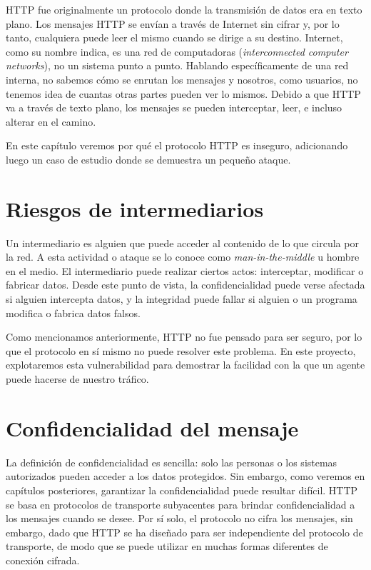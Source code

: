 


HTTP fue originalmente un protocolo donde la transmisión de datos era en texto 
plano. Los mensajes HTTP se envían a través de Internet sin cifrar y, por 
lo tanto, cualquiera puede leer el mismo cuando se dirige a su destino. 
Internet, como su nombre indica, es una red de computadoras 
(\emph{interconnected computer networks}), no un sistema 
punto a punto. Hablando específicamente de una red interna, no sabemos cómo 
se enrutan los 
mensajes y nosotros, como usuarios, no tenemos idea de cuantas otras partes 
pueden ver lo mismos. Debido a que HTTP va a través de texto plano, 
los mensajes se pueden interceptar, leer, e incluso alterar en el camino.

En este capítulo veremos por qué el protocolo HTTP es inseguro, adicionando
luego un 
caso de estudio donde se demuestra un pequeño ataque.

\section{Riesgos de intermediarios}

Un intermediario es alguien que puede acceder al contenido de lo que circula por 
la red. A esta actividad o ataque se lo conoce como \emph{man-in-the-middle} u 
hombre en el medio. 
El intermediario puede realizar ciertos actos: interceptar, modificar o 
fabricar datos. Desde este punto de vista, la confidencialidad puede verse 
afectada si alguien intercepta datos, y la integridad puede fallar si 
alguien o un programa modifica o fabrica datos falsos. 

Como mencionamos anteriormente, HTTP no fue pensado para ser seguro, por lo que 
el protocolo en sí mismo no puede resolver este problema.
En este proyecto, explotaremos esta vulnerabilidad para demostrar la facilidad
 con la que un agente puede hacerse de nuestro tráfico.




\section{Confidencialidad del mensaje}
La definición de confidencialidad es sencilla: solo las personas o los 
sistemas autorizados pueden acceder a los datos protegidos.
Sin embargo, como veremos en capítulos posteriores, garantizar la confidencialidad 
puede resultar difícil.
 HTTP se basa en 
protocolos de transporte subyacentes para brindar confidencialidad a los 
mensajes cuando se desee. Por sí solo, el protocolo no cifra los mensajes, 
sin embargo, dado que HTTP se ha diseñado para ser independiente del protocolo de 
transporte, de modo que se puede utilizar en muchas formas diferentes de 
conexión cifrada.


